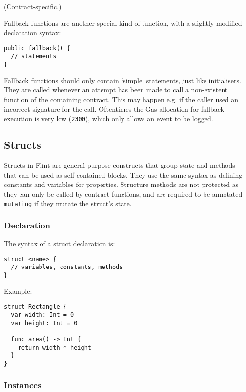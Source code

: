 (Contract-specific.)

Fallback functions are another special kind of function, with a slightly modified declaration syntax:

\begin{verbatim}
public fallback() {
  // statements
}
\end{verbatim}

Fallback functions should only contain `simple' statements, just like initialisers. They are called whenever an attempt has been made to call a non-existent function of the containing contract. This may happen e.g. if the caller used an incorrect signature for the call. Oftentimes the Gas allocation for fallback execution is very low (\texttt{2300}), which only allows an \hyperref[sec:appendix-b-events]{event} to be logged.

\subsection{Structs}
\label{sec:appendix-b-structs}

Structs in Flint are general-purpose constructs that group state and methods that can be used as self-contained blocks. They use the same syntax as defining constants and variables for properties. Structure methods are not protected as they can only be called by contract functions, and are required to be annotated \texttt{mutating} if they mutate the struct's state.

\subsubsection{Declaration}
\label{sec:appendix-b-declaration}

The syntax of a struct declaration is:

\begin{verbatim}
struct <name> {
  // variables, constants, methods
}
\end{verbatim}

Example:

\begin{verbatim}
struct Rectangle {
  var width: Int = 0
  var height: Int = 0

  func area() -> Int {
    return width * height
  }
}
\end{verbatim}

\subsubsection{Instances}
\label{sec:appendix-b-instances}

